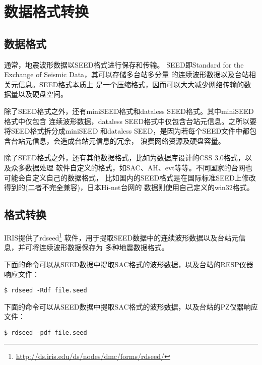 \section{数据格式转换}
\subsection{数据格式}
通常，地震波形数据以SEED格式进行保存和传输。
SEED即Standard for the Exchange of Seismic Data，其可以存储多台站多分量
的连续波形数据以及台站相关元信息。SEED格式本质上
是一个压缩格式，因而可以大大减少网络传输的数据量以及硬盘空间。

除了SEED格式之外，还有miniSEED格式和dataless SEED格式。其中miniSEED格式中仅包含
连续波形数据，dataless SEED格式中仅包含台站元信息。之所以要将SEED格式拆分成miniSEED
和dataless SEED，是因为若每个SEED文件中都包含台站元信息，会造成台站元信息的冗余，
浪费网络资源及硬盘容量。

除了SEED格式之外，还有其他数据格式，比如为数据库设计的CSS 3.0格式，以及众多数据处理
软件自定义的格式，如SAC、AH、evt等等。不同国家的台网也可能会自定义自己的数据格式，
比如国内的SEED格式是在国际标准SEED上修改得到的(二者不完全兼容)，日本Hi-net台网的
数据则使用自己定义的win32格式。

\subsection{格式转换}
IRIS提供了rdseed\footnote{\url{http://ds.iris.edu/ds/nodes/dmc/forms/rdseed/}}
软件，用于提取SEED数据中的连续波形数据以及台站元信息，并可将连续波形数据保存为
多种地震数据格式。

下面的命令可以从SEED数据中提取SAC格式的波形数据，以及台站的RESP仪器响应文件：
\begin{verbatim}
$ rdseed -Rdf file.seed
\end{verbatim}

下面的命令可以从SEED数据中提取SAC格式的波形数据，以及台站的PZ仪器响应文件：
\begin{verbatim}
$ rdseed -pdf file.seed
\end{verbatim}
